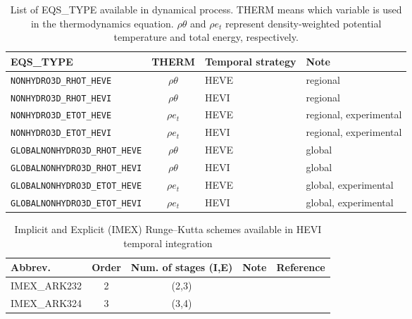 \begin{table}[bth]
\begin{center}
  \caption{List of EQS\_TYPE available in dynamical process. 
  THERM means which variable is used in the thermodynamics equation. 
  $\rho \theta$ and $\rho e_t$ represent density-weighted potential temperature and total energy, respectively.}
  \label{tab:nml_atm_dyn_governeq}
  \begin{tabularx}{150mm}{lcXX} \hline
    \rowcolor[gray]{0.9}  EQS\_TYPE & THERM & Temporal strategy & Note \\ \hline
      \verb|NONHYDRO3D_RHOT_HEVE|  & $\rho \theta$ & HEVE & regional\\
      \verb|NONHYDRO3D_RHOT_HEVI|  & $\rho \theta$ & HEVI & regional \\
      \verb|NONHYDRO3D_ETOT_HEVE|  & $\rho e_t$ & HEVE & regional, experimental \\
      \verb|NONHYDRO3D_ETOT_HEVI|  & $\rho e_t$ & HEVI & regional, experimental \\
    \hline
      \verb|GLOBALNONHYDRO3D_RHOT_HEVE|  & $\rho \theta$ & HEVE & global \\
      \verb|GLOBALNONHYDRO3D_RHOT_HEVI|  & $\rho \theta$ & HEVI & global \\
      \verb|GLOBALNONHYDRO3D_ETOT_HEVE|  & $\rho e_t$ & HEVE & global, experimental \\
      \verb|GLOBALNONHYDRO3D_ETOT_HEVI|  & $\rho e_t$ & HEVI & global, experimental \\
    \hline
  \end{tabularx}
\end{center}
\end{table}

\begin{table}[t]
\caption{Implicit and Explicit (IMEX) Runge--Kutta schemes available in HEVI temporal integration}
\begin{tabular}{l|cccc}
\hline
Abbrev. & Order & Num. of stages (I,E) & Note & Reference \\
\hline
IMEX\_ARK232 & 2 & (2,3) &  & \cite{Giraldo2013} \\
\hline
IMEX\_ARK324 & 3 & (3,4) &  & \cite{kennedy2003additive} \\
\hline
\end{tabular}
\label{tb:HEVI_temporal_integ_choice}
\end{table}



